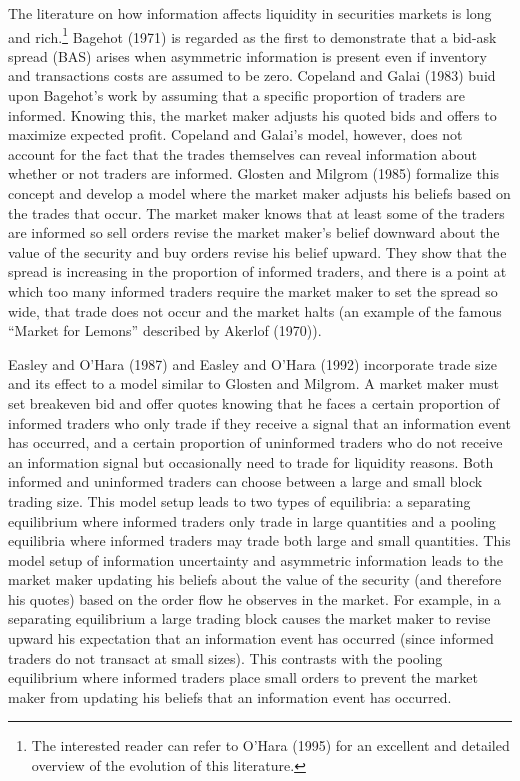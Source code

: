 \documentclass[]{elsarticle} %
\begin{document}
The literature on how information affects liquidity in securities
markets is long and rich.\footnote{The interested reader can refer to
  O'Hara (1995) for an excellent and detailed overview of the evolution
  of this literature.} Bagehot (1971) is regarded as the first to
demonstrate that a bid-ask spread (BAS) arises when asymmetric
information is present even if inventory and transactions costs are
assumed to be zero. Copeland and Galai (1983) buid upon Bagehot's work
by assuming that a specific proportion of traders are informed. Knowing
this, the market maker adjusts his quoted bids and offers to maximize
expected profit. Copeland and Galai's model, however, does not account
for the fact that the trades themselves can reveal information about
whether or not traders are informed. Glosten and Milgrom (1985)
formalize this concept and develop a model where the market maker
adjusts his beliefs based on the trades that occur. The market maker
knows that at least some of the traders are informed so sell orders
revise the market maker's belief downward about the value of the
security and buy orders revise his belief upward. They show that the
spread is increasing in the proportion of informed traders, and there is
a point at which too many informed traders require the market maker to
set the spread so wide, that trade does not occur and the market halts
(an example of the famous ``Market for Lemons'' described by Akerlof
(1970)).

Easley and O'Hara (1987) and Easley and O'Hara (1992) incorporate trade
size and its effect to a model similar to Glosten and Milgrom. A market
maker must set breakeven bid and offer quotes knowing that he faces a
certain proportion of informed traders who only trade if they receive a
signal that an information event has occurred, and a certain proportion
of uninformed traders who do not receive an information signal but
occasionally need to trade for liquidity reasons. Both informed and
uninformed traders can choose between a large and small block trading
size. This model setup leads to two types of equilibria: a separating
equilibrium where informed traders only trade in large quantities and a
pooling equilibria where informed traders may trade both large and small
quantities. This model setup of information uncertainty and asymmetric
information leads to the market maker updating his beliefs about the
value of the security (and therefore his quotes) based on the order flow
he observes in the market. For example, in a separating equilibrium a
large trading block causes the market maker to revise upward his
expectation that an information event has occurred (since informed
traders do not transact at small sizes). This contrasts with the pooling
equilibrium where informed traders place small orders to prevent the
market maker from updating his beliefs that an information event has
occurred.
\end{document}
